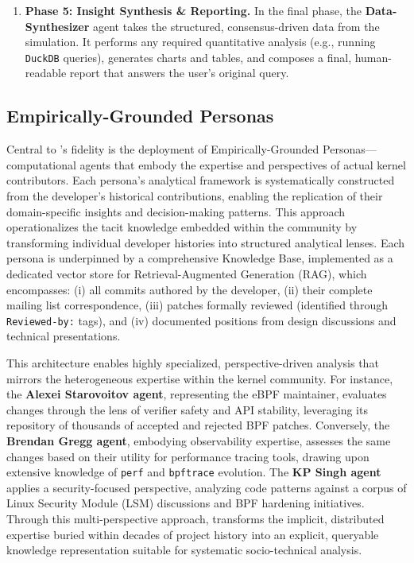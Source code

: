 \begin{enumerate}
\item \textbf{Phase 5: Insight Synthesis \& Reporting.} In the final phase, the \textbf{Data-Synthesizer} agent takes the structured, consensus-driven data from the simulation. It performs any required quantitative analysis (e.g., running \texttt{DuckDB} queries), generates charts and tables, and composes a final, human-readable report that answers the user's original query.
\end{enumerate}


\subsection{Empirically-Grounded Personas}

Central to \sys's fidelity is the deployment of Empirically-Grounded Personas—computational agents that embody the expertise and perspectives of actual kernel contributors. Each persona's analytical framework is systematically constructed from the developer's historical contributions, enabling the replication of their domain-specific insights and decision-making patterns. This approach operationalizes the tacit knowledge embedded within the community by transforming individual developer histories into structured analytical lenses. Each persona is underpinned by a comprehensive Knowledge Base, implemented as a dedicated vector store for Retrieval-Augmented Generation (RAG), which encompasses: (i) all commits authored by the developer, (ii) their complete mailing list correspondence, (iii) patches formally reviewed (identified through \texttt{Reviewed-by:} tags), and (iv) documented positions from design discussions and technical presentations.

This architecture enables highly specialized, perspective-driven analysis that mirrors the heterogeneous expertise within the kernel community. For instance, the \textbf{Alexei Starovoitov agent}, representing the eBPF maintainer, evaluates changes through the lens of verifier safety and API stability, leveraging its repository of thousands of accepted and rejected BPF patches. Conversely, the \textbf{Brendan Gregg agent}, embodying observability expertise, assesses the same changes based on their utility for performance tracing tools, drawing upon extensive knowledge of \texttt{perf} and \texttt{bpftrace} evolution. The \textbf{KP Singh agent} applies a security-focused perspective, analyzing code patterns against a corpus of Linux Security Module (LSM) discussions and BPF hardening initiatives. Through this multi-perspective approach, \sys transforms the implicit, distributed expertise buried within decades of project history into an explicit, queryable knowledge representation suitable for systematic socio-technical analysis.


